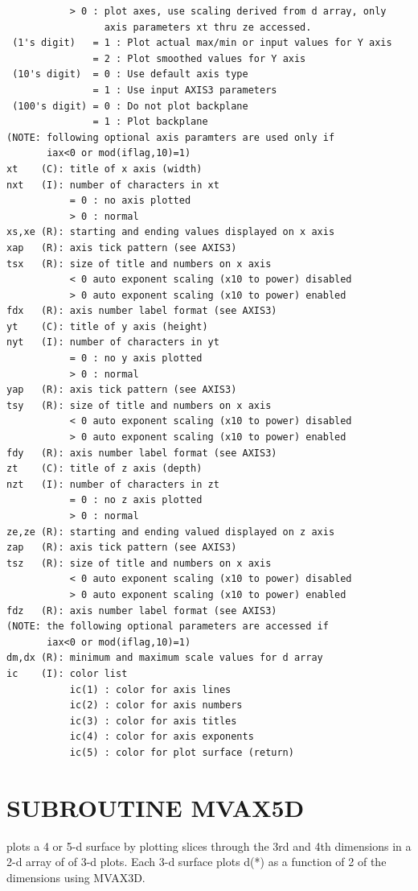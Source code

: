 \documentclass[11pt]{report}
\begin{document}
\begin{verbatim}
           > 0 : plot axes, use scaling derived from d array, only
                 axis parameters xt thru ze accessed.
 (1's digit)   = 1 : Plot actual max/min or input values for Y axis
               = 2 : Plot smoothed values for Y axis
 (10's digit)  = 0 : Use default axis type
               = 1 : Use input AXIS3 parameters
 (100's digit) = 0 : Do not plot backplane
               = 1 : Plot backplane
(NOTE: following optional axis paramters are used only if
       iax<0 or mod(iflag,10)=1)
xt    (C): title of x axis (width)
nxt   (I): number of characters in xt
           = 0 : no axis plotted
           > 0 : normal
xs,xe (R): starting and ending values displayed on x axis
xap   (R): axis tick pattern (see AXIS3)
tsx   (R): size of title and numbers on x axis
           < 0 auto exponent scaling (x10 to power) disabled
           > 0 auto exponent scaling (x10 to power) enabled
fdx   (R): axis number label format (see AXIS3)
yt    (C): title of y axis (height)
nyt   (I): number of characters in yt
           = 0 : no y axis plotted
           > 0 : normal
yap   (R): axis tick pattern (see AXIS3)
tsy   (R): size of title and numbers on x axis
           < 0 auto exponent scaling (x10 to power) disabled
           > 0 auto exponent scaling (x10 to power) enabled
fdy   (R): axis number label format (see AXIS3)
zt    (C): title of z axis (depth)
nzt   (I): number of characters in zt
           = 0 : no z axis plotted
           > 0 : normal
ze,ze (R): starting and ending valued displayed on z axis
zap   (R): axis tick pattern (see AXIS3)
tsz   (R): size of title and numbers on x axis
           < 0 auto exponent scaling (x10 to power) disabled
           > 0 auto exponent scaling (x10 to power) enabled
fdz   (R): axis number label format (see AXIS3)
(NOTE: the following optional parameters are accessed if 
       iax<0 or mod(iflag,10)=1)
dm,dx (R): minimum and maximum scale values for d array
ic    (I): color list
           ic(1) : color for axis lines
           ic(2) : color for axis numbers
           ic(3) : color for axis titles
           ic(4) : color for axis exponents
           ic(5) : color for plot surface (return)
\end{verbatim}

\newpage
\section{SUBROUTINE MVAX5D}

 plots a 4 or 5-d surface by plotting slices through the 3rd and
4th dimensions in a 2-d array of of 3-d plots. Each 3-d surface
plots d(*) as a function of 2 of the dimensions using MVAX3D.
\end{document}
